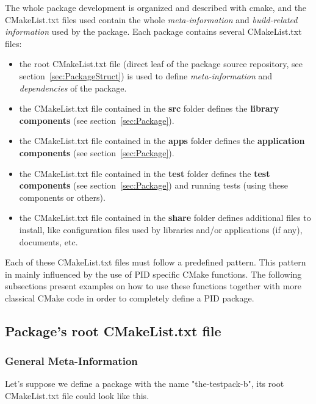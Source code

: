 \documentclass[12pt,a4paper]{article}
\begin{document}
The whole package development is organized and described with cmake, and the CMakeList.txt files used contain the whole \textit{meta-information} and \textit{build-related information} used by the package. Each package contains several CMakeList.txt files:
\begin{itemize}
\item the root CMakeList.txt file (direct leaf of the package source repository, see section~\ref{sec:PackageStruct}) is used to define \textit{meta-information} and \textit{dependencies} of the package.
\item the CMakeList.txt file contained in the \textbf{src} folder defines the \textbf{library components} (see section~\ref{sec:Package}).
\item the CMakeList.txt file contained in the \textbf{apps} folder defines the \textbf{application components} (see section~\ref{sec:Package}).
\item the CMakeList.txt file contained in the \textbf{test} folder defines the \textbf{test components} (see section~\ref{sec:Package}) and running tests (using these components or others).
\item the CMakeList.txt file contained in the \textbf{share} folder defines additional files to install, like configuration files used by libraries and/or applications (if any), documents, etc.
\end{itemize}

Each of these CMakeList.txt files must follow a predefined pattern. This pattern in mainly influenced by the use of PID specific CMake functions. The following subsections present examples on how to use these functions together with more classical CMake code in order to completely define a PID package.

\subsection{Package's root CMakeList.txt file}
\label{sec:rootCMake}

\subsubsection{General Meta-Information}
\label{sec:rootCMakeGeneral}

Let's suppose we define a package with the name "the-testpack-b", its root CMakeList.txt file could look like this.
\end{document}
